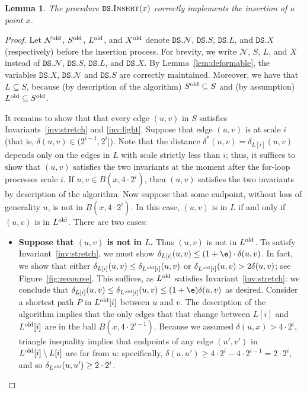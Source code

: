 \documentclass[11pt]{article}
\newtheorem{lemma}[theorem]{Lemma}
\newcommand{\cN}{\mathcal{N}}
\newcommand{\dist}{\ensuremath{\delta}}
\newcommand{\DS}{\texttt{DS}}
\newcommand{\points}{{\ensuremath{\DS.X}}}
\newcommand{\sparse}{{\ensuremath{\DS.S}}}
\newcommand{\net}{{\ensuremath{\DS.\cN}}}
\newcommand{\light}{{\ensuremath{\DS.L}}}
\begin{document}
\begin{lemma}
\label{lem:insert-invariants}
The procedure $\DS.\textsc{Insert}(x)$ correctly implements the insertion of a point $x$.
\end{lemma}
\begin{proof}
Let $\cN^{\rm old}$, $S^{\rm old}$, $L^{\rm old}$, and $X^{\rm old}$ denote $\net$, $\sparse$, $\light$, and $\points$ (respectively) before the insertion process.
For brevity, we write $\cN$, $S$, $L$, and $X$ instead of $\net$, $\sparse$, $\light$, and $\points$.
By Lemma~\ref{lem:deformable}, the variables $\points$, $\net$ and $\sparse$ are correctly maintained.
% 
Moreover, we have that $L \subseteq S$, because (by description of the algorithm) $S^{\rm old} \subseteq S$ and (by assumption) $L^{\rm old} \subseteq S^{\rm old}$.


    It remains to show that that every edge $(u,v)$ in $S$ satisfies Invariants~\ref{inv:stretch} and \ref{inv:light}.
    Suppose that edge $(u,v)$ is at scale $i$ (that is, $\delta(u,v)\in (2^{i-1},2^{i}]$).
    Note that the distance $\dist^*(u,v) = \dist_{L[i]}(u,v)$ 
    depends only on the edges in $L$ with scale strictly less than $i$; thus, it suffices to show that $(u,v)$ satisfies the two invariants at the moment after the for-loop processes scale $i$.
    If $u,v \in B(x, 4 \cdot 2^i)$, then $(u,v)$ satisfies the two invariants by description of the algorithm. Now suppose that some endpoint, without loss of generality $u$, is not in $B(x, 4 \cdot 2^i)$. In this case, $(u,v)$ is in $L$ if and only if $(u,v)$ is in $L^{\rm old}$. There are two cases:
    \begin{itemize}
        \item \textbf{\boldmath Suppose that $(u,v)$ is not in $L$.} Thus $(u,v)$ is not in $L^{\rm old}$. To satisfy Invariant~\ref{inv:stretch}, we must show $\dist_{L[i]}(u,v) \le (1+\e) \cdot \dist(u,v)$. In fact, we show that either $\dist_{L[i]}(u,v) \le \dist_{L^{\rm old}[i]}(u,v)$ or $\dist_{L^{\rm old}[i]}(u,v) > 2 \dist(u,v)$; see Figure~\ref{fig:recourse}. This suffices, as $L^{\rm old}$ satisfies Invariant~\ref{inv:stretch}: we conclude that $\dist_{L[i]}(u,v) \le \dist_{L^{\rm old}[i]}(u,v) \le (1+\e) \dist(u,v)$ as desired. Consider a shortest path $P$ in $L^{\rm old}[i]$ between $u$ and $v$. 
        The description of the algorithm implies that the only edges that that change between $L[i]$ and $L^{\rm old}[i]$ are in the ball $B(x, 4 \cdot 2^{i-1})$. Because we assumed $\dist(u,x) > 4 \cdot 2^i$, triangle inequality implies that endpoints of any edge $(u',v')$ in $L^{\rm old}[i] \setminus L[i]$ are far from $u$: specifically, $\dist(u,u') \ge 4 \cdot 2^i - 4 \cdot 2^{i-1} = 2 \cdot 2^i$, and so $\dist_{L^{\rm old}}(u,u') \ge 2 \cdot 2^i$.

\end{itemize}
\end{proof}
\end{document}
